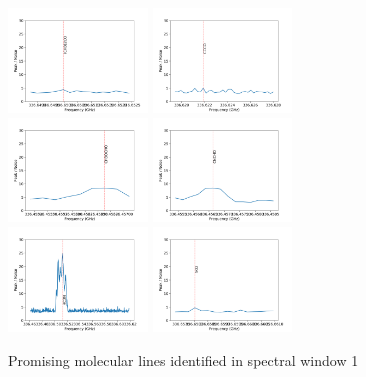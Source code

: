 \documentclass[10pt]{article}
\begin{document}
\newpage
   \begin{figure}
    \includegraphics[width=0.33\textwidth]{spw1_(CH3)2CO}
    \includegraphics[width=0.33\textwidth]{spw1_CCCO}
    \includegraphics[width=0.33\textwidth]{spw1_CH3OCHO}
    \includegraphics[width=0.33\textwidth]{spw1_CNCHO}
    \includegraphics[width=0.33\textwidth]{spw1_HC3N}
    \includegraphics[width=0.33\textwidth]{spw1_SO2}
    \caption{Promising molecular lines identified in spectral window 1}
   \end{figure}
   
\end{document}
